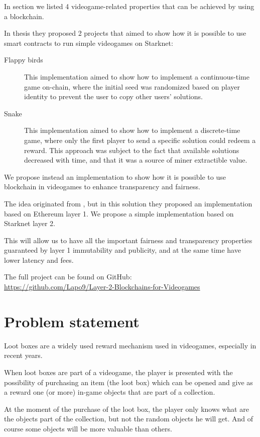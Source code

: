 \documentclass[12pt]{article}
\begin{document}
In section  we listed 4 videogame-related properties that can be achieved by using a blockchain.

In \cite{main_thesis} thesis they proposed 2 projects that aimed to show how it is possible to use smart contracts to run simple videogames on Starknet:
\begin{description}
    \item[Flappy birds] This implementation aimed to show how to implement a continuous-time game on-chain, where the initial seed was randomized based on player identity to prevent the user to copy other users' solutions.
    \item[Snake] This implementation aimed to show how to implement a discrete-time game, where only the first player to send a specific solution could redeem a reward. This approach was subject to the fact that available solutions decreased with time, and that it was a source of miner extractible value.
\end{description}

We propose instead an implementation to show how it is possible to use blockchain in videogames to enhance transparency and fairness.

The idea originated from \cite{fair_lootboxes}, but in this solution they proposed an implementation based on Ethereum layer 1. We propose a simple implementation based on Starknet layer 2.

This will allow us to have all the important fairness and transparency properties guaranteed by layer 1 immutability and publicity, and at the same time have lower latency and fees.

The full project can be found on GitHub:\\\url{https://github.com/Lapo9/Layer-2-Blockchains-for-Videogames}

\section{Problem statement} \label{section:problem_statement}
Loot boxes are a widely used reward mechanism used in videogames, especially in recent years.

When loot boxes are part of a videogame, the player is presented with the possibility of purchasing an item (the loot box) which can be opened and give as a reward one (or more) in-game objects that are part of a collection.

At the moment of the purchase of the loot box, the player only knows what are the objects part of the collection, but not the random objects he will get. And of course some objects will be more valuable than others.
\end{document}
